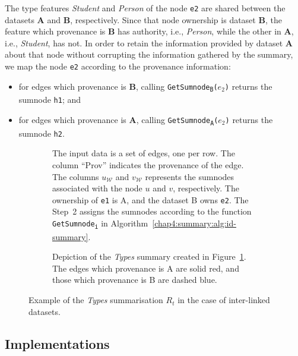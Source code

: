The type features \emph{Student} and \emph{Person} of the node \texttt{e2} are shared between the datasets \textbf{A} and \textbf{B}, respectively. Since that node ownership is dataset \textbf{B}, the feature which provenance is \textbf{B} has authority, i.e., \emph{Person}, while the other in \textbf{A}, i.e., \emph{Student}, has not. In order to retain the information provided by dataset \textbf{A} about that node without corrupting the information gathered by the summary, we map the node \texttt{e2} according to the provenance information:
\begin{itemize}
\item for edges which provenance is \textbf{B}, calling \texttt{GetSumnode\textsubscript{B}($e_2$)} returns the sumnode \texttt{h1}; and
\item for edges which provenance is \textbf{A}, calling \texttt{GetSumnode\textsubscript{A}($e_2$)} returns the sumnode \texttt{h2}.
\end{itemize}

\begin{figure}
	\centering
	\begin{subfigure}{\textwidth}
		\centering
		\resizebox{\textwidth}{!}{
			
		}
		\caption{The input data is a set of edges, one per row. The column ``Prov'' indicates the provenance of the edge. The columns $u_\mathcal{W}$ and $v_\mathcal{W}$ represents the sumnodes associated with the node $u$ and $v$, respectively. The ownership of \texttt{e1} is A, and the dataset B owns \texttt{e2}. The Step~2 assigns the sumnodes according to the function \texttt{GetSumnode\textsubscript{i}} in Algorithm~\ref{chap4:summary:alg:id-summary}.}
		\label{tab:id-algo-ex}
	\end{subfigure}
	\quad
	\begin{subfigure}{.8\textwidth}
		\centering
		\resizebox{.8\textwidth}{!}{
			
		}
		\caption{Depiction of the \emph{Types} summary created in Figure~\ref{tab:id-algo-ex}. The edges which provenance is A are solid red, and those which provenance is B are dashed blue.}
		\label{chap4:summary:fig:id-algo-ex}
	\end{subfigure}
	\caption{Example of the \emph{Types} summarisation $R_t$ in the case of inter-linked datasets.}
\end{figure}

\subsection{Implementations}
\label{sec:summary-impl}

